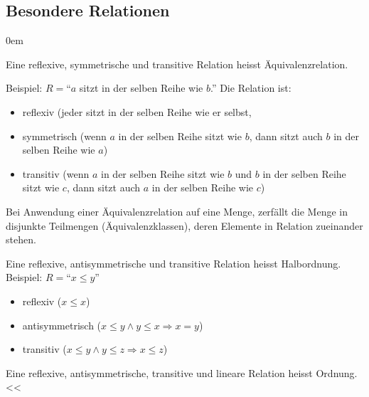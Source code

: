 \subsection{Besondere Relationen}
\begin{description}\itemsep0em
	\item [Äquivalenzrelation]
	Eine reflexive, symmetrische und transitive Relation heisst Äquivalenzrelation.

	Beispiel: $R = $\enquote{$a$ sitzt in der selben Reihe wie $b$.} Die Relation ist:
	\begin{itemize}
		\item reflexiv (jeder sitzt in der selben Reihe wie er selbst,
		\item symmetrisch (wenn $a$ in der selben Reihe sitzt wie $b$, dann sitzt auch $b$ in der selben Reihe wie $a$)
		\item transitiv (wenn $a$ in der selben Reihe sitzt wie $b$ und $b$ in der selben Reihe sitzt wie $c$, dann sitzt auch $a$ in der selben Reihe wie $c$)
	\end{itemize}
	Bei Anwendung einer Äquivalenzrelation auf eine Menge, zerfällt die Menge in disjunkte Teilmengen (Äquivalenzklassen), deren Elemente in Relation zueinander stehen.

	\item[Halbordnung]
	Eine reflexive, antisymmetrische und transitive Relation heisst Halbordnung.
	Beispiel: $R = $\enquote{$x \leq y$}
	\begin{itemize}
		\item reflexiv ($x \leq x$)
		\item antisymmetrisch ($x \leq y \wedge y \leq x \Rightarrow x = y$) 
		\item transitiv ($x \leq y \wedge y \leq z \Rightarrow x \leq z$)
	\end{itemize}

	\item[Ordnung]
	Eine reflexive, antisymmetrische, transitive und lineare Relation heisst Ordnung.<<
	
\end{description}

